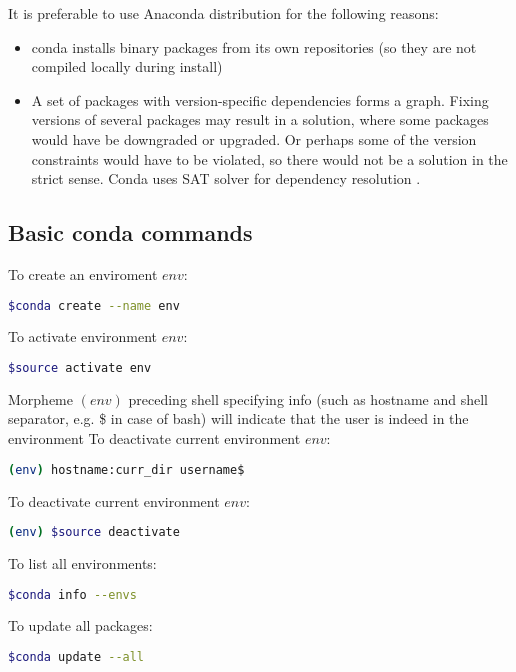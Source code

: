 \documentclass[article]{revtex4}
\begin{document}
It is preferable to use Anaconda distribution for the following reasons:
\begin{itemize}
    \item conda installs binary packages from its own repositories (so they are not compiled locally during install)
    \item A set of packages with version-specific dependencies forms a graph. Fixing versions of several packages may result in a solution, where some packages would have be downgraded or upgraded. Or perhaps some of the version constraints would have to be violated, so there would not be a solution in the strict sense. Conda uses SAT solver for dependency resolution \cite{satsolver}.
\end{itemize}

\subsection{Basic conda commands}

\noindent To create an enviroment $env$:
\begin{lstlisting}[language=bash]
$conda create --name env
\end{lstlisting}

\noindent To activate environment $env$:
\begin{lstlisting}[language=bash]
$source activate env
\end{lstlisting}

Morpheme $(env)$ preceding shell specifying info  (such as hostname and shell separator, e.g. \$ in case of bash) will indicate that the user is indeed in the environment
\noindent To deactivate current environment $env$:
\begin{lstlisting}[language=bash]
(env) hostname:curr_dir username$
\end{lstlisting}

\noindent To deactivate current environment $env$:
\begin{lstlisting}[language=bash]
(env) $source deactivate
\end{lstlisting}

\noindent To list all environments:
\begin{lstlisting}[language=bash]
$conda info --envs
\end{lstlisting}

\noindent To update all packages:
\begin{lstlisting}[language=bash]
$conda update --all
\end{lstlisting}
\end{document}

